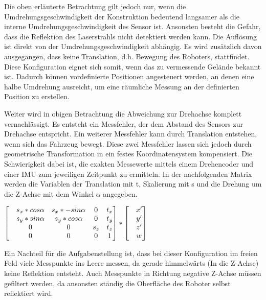 Die oben erläuterte Betrachtung gilt jedoch nur, wenn die Umdrehungsgeschwindigkeit der Konstruktion bedeutend langsamer als die interne Umdrehungsgeschwindigkeit des Sensor ist. Ansonsten besteht die Gefahr, dass die Reflektion des Laserstrahls nicht detektiert werden kann. Die Auflösung ist direkt von der Umdrehungsgeschwindigkeit abhängig. Es wird zusätzlich davon ausgegangen, dass keine Translation, d.h. Bewegung des Roboters, stattfindet. Diese Konfiguration eignet sich somit, wenn das zu vermessende Gelände bekannt ist. Dadurch können vordefinierte Positionen angesteuert werden, an denen eine halbe Umdrehung ausreicht, um eine räumliche Messung an der definierten Position zu erstellen. 

Weiter wird in obigen Betrachtung die Abweichung zur Drehachse komplett vernachlässigt. Es entsteht ein Messfehler, der dem Abstand  des Sensors zur Drehachse entspricht. Ein weiterer Messfehler kann durch Translation entstehen, wenn sich das Fahrzeug bewegt. Diese zwei Messfehler lassen sich jedoch durch geometrische Transformation in ein festes Koordinatensystem kompensiert. Die Schwierigkeit dabei ist, die exakten Messewerte mittels einem Drehencoder und einer \ac{IMU} zum jeweiligen Zeitpunkt zu ermitteln. In der nachfolgenden Matrix werden die Variablen der Translation mit t, Skalierung mit s und die Drehung um die Z-Achse mit dem Winkel $\alpha$  angegeben. 
\begin{center}

$\begin{bmatrix}
\centering
\label{fig:TFmatrix}
&s_x * cos\alpha  &s_x*-sin\alpha   &0 &t_x \\ 
&s_y*sin\alpha   &s_y*cos\alpha  &0 &t_y \\ 
&0  &0 &s_z &t_z \\ 
&0  &0  &0 &1 
\end{bmatrix} *\begin{bmatrix}
&x'  \\ 
&y'  \\ 
&z'  \\ 
&w   
\end{bmatrix}$
\end{center}

Ein Nachteil für die Aufgabenstellung ist, dass bei dieser Konfiguration im freien Feld viele Messpunkte ins Leere messen, da gerade himmelwärts (In die Z-Achse) keine Reflektion entsteht. Auch Messpunkte in Richtung negative Z-Achse müssen gefiltert werden, da ansonsten ständig die Oberfläche des Roboter selbst reflektiert wird.

